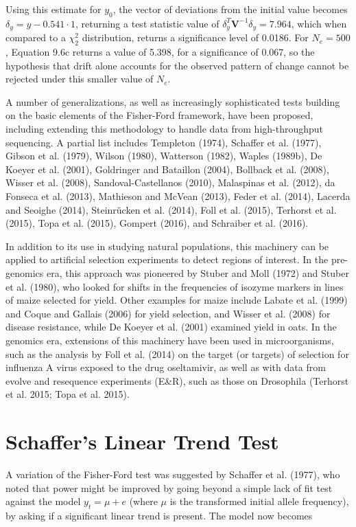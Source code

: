 \documentclass{article}
\begin{document}
Using this estimate for  $ y_0 $, the vector of deviations from the initial value becomes  $ \delta_y = y - 0.541 \cdot 1 $, returning a test statistic value of  $ \delta_y^T \mathbf{V}^{-1} \delta_y = 7.964 $, which when compared to a  $ \chi_2^2 $ distribution, returns a significance level of 0.0186. For  $ N_e = 500 $, Equation 9.6c returns a value of 5.398, for a significance of 0.067, so the hypothesis that drift alone accounts for the observed pattern of change cannot be rejected under this smaller value of  $ N_e $.

A number of generalizations, as well as increasingly sophisticated tests building on the basic elements of the Fisher-Ford framework, have been proposed, including extending this methodology to handle data from high-throughput sequencing. A partial list includes Templeton (1974), Schaffer et al. (1977), Gibson et al. (1979), Wilson (1980), Watterson (1982), Waples (1989b), De Koeyer et al. (2001), Goldringer and Bataillon (2004), Bollback et al. (2008), Wisser et al. (2008), Sandoval-Castellanos (2010), Malaspinas et al. (2012), da Fonseca et al. (2013), Mathieson and McVean (2013), Feder et al. (2014), Lacerda and Seoighe (2014), Steinrücken et al. (2014), Foll et al. (2015), Terhorst et al. (2015), Topa et al. (2015), Gompert (2016), and Schraiber et al. (2016).

In addition to its use in studying natural populations, this machinery can be applied to artificial selection experiments to detect regions of interest. In the pre-genomics era, this approach was pioneered by Stuber and Moll (1972) and Stuber et al. (1980), who looked for shifts in the frequencies of isozyme markers in lines of maize selected for yield. Other examples for maize include Labate et al. (1999) and Coque and Gallais (2006) for yield selection, and Wisser et al. (2008) for disease resistance, while De Koeyer et al. (2001) examined yield in oats. In the genomics era, extensions of this machinery have been used in microorganisms, such as the analysis by Foll et al. (2014) on the target (or targets) of selection for influenza A virus exposed to the drug oseltamivir, as well as with data from evolve and resequence experiments (E&R), such as those on Drosophila (Terhorst et al. 2015; Topa et al. 2015).

\section{Schaffer's Linear Trend Test}
A variation of the Fisher-Ford test was suggested by Schaffer et al. (1977), who noted that power might be improved by going beyond a simple lack of fit test against the model  $ y_{t} = \mu + e $ (where  $ \mu $ is the transformed initial allele frequency), by asking if a significant linear trend is present. The model now becomes
\end{document}
